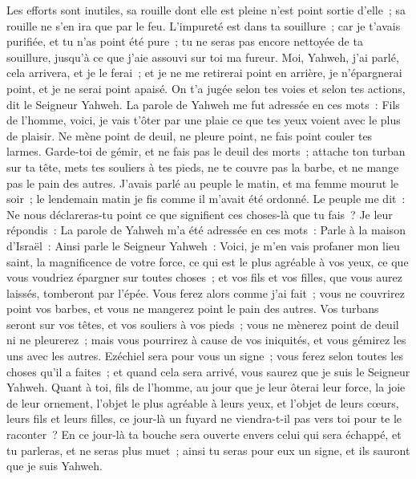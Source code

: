 \begin{multicols}{2}
Les efforts sont inutiles, sa rouille dont elle est pleine n'est point sortie d'elle~; sa rouille ne s'en ira que par le feu.
L'impureté est dans ta souillure~; car je t'avais purifiée, et tu n'as point été pure~; tu ne seras pas encore nettoyée de ta souillure, jusqu'à ce que j'aie assouvi sur toi ma fureur.
Moi, Yahweh, j'ai parlé, cela arrivera, et je le ferai~; et je ne me retirerai point en arrière, je n'épargnerai point, et je ne serai point apaisé. On t'a jugée selon tes voies et selon tes actions, dit le Seigneur Yahweh.
La parole de Yahweh me fut adressée en ces mots~:
Fils de l'homme, voici, je vais t'ôter par une plaie ce que tes yeux voient avec le plus de plaisir. Ne mène point de deuil, ne pleure point, ne fais point couler tes larmes.
Garde-toi de gémir, et ne fais pas le deuil des morts~; attache ton turban sur ta tête, mets tes souliers à tes pieds, ne te couvre pas la barbe, et ne mange pas le pain des autres.
J'avais parlé au peuple le matin, et ma femme mourut le soir~; le lendemain matin je fis comme il m'avait été ordonné.
Le peuple me dit~: Ne nous déclareras-tu point ce que signifient ces choses-là que tu fais~?
Je leur répondis~: La parole de Yahweh m'a été adressée en ces mots~:
Parle à la maison d'Israël~: Ainsi parle le Seigneur Yahweh~: Voici, je m'en vais profaner mon lieu saint, la magnificence de votre force, ce qui est le plus agréable à vos yeux, ce que vous voudriez épargner sur toutes choses~; et vos fils et vos filles, que vous aurez laissés, tomberont par l'épée.
Vous ferez alors comme j'ai fait~; vous ne couvrirez point vos barbes, et vous ne mangerez point le pain des autres.
Vos turbans seront sur vos têtes, et vos souliers à vos pieds~; vous ne mènerez point de deuil ni ne pleurerez~; mais vous pourrirez à cause de vos iniquités, et vous gémirez les uns avec les autres. Ezéchiel sera pour vous un signe~; 
vous ferez selon toutes les choses qu'il a faites~; et quand cela sera arrivé, vous saurez que je suis le Seigneur Yahweh.
Quant à toi, fils de l'homme, au jour que je leur ôterai leur force, la joie de leur ornement, l'objet le plus agréable à leurs yeux, et l'objet de leurs cœurs, leurs fils et leurs filles,
ce jour-là un fuyard ne viendra-t-il pas vers toi pour te le raconter~?
En ce jour-là ta bouche sera ouverte envers celui qui sera échappé, et tu parleras, et ne seras plus muet~; ainsi tu seras pour eux un signe, et ils sauront que je suis Yahweh.

\end{multicols}
